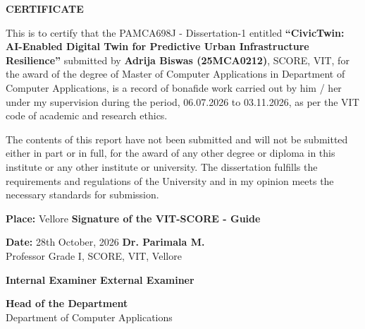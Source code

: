 \begin{center}
    {\fontsize{14pt}{18pt}\selectfont \textbf{CERTIFICATE}\par}
\end{center}
\vspace{1.5cm}

\noindent This is to certify that the PAMCA698J - Dissertation-1 entitled \textbf{``CivicTwin: AI-Enabled Digital Twin for Predictive Urban Infrastructure Resilience''} submitted by \textbf{Adrija Biswas (25MCA0212)}, SCORE, VIT, for the award of the degree of Master of Computer Applications in Department of Computer Applications, is a record of bonafide work carried out by him / her under my supervision during the period, 06.07.2026 to 03.11.2026, as per the VIT code of academic and research ethics.

\vspace{0.8cm}
\noindent The contents of this report have not been submitted and will not be submitted either in part or in full, for the award of any other degree or diploma in this institute or any other institute or university. The dissertation fulfills the requirements and regulations of the University and in my opinion meets the necessary standards for submission.

\vspace{2.5cm}
\noindent \textbf{Place:} Vellore \hfill \textbf{Signature of the VIT-SCORE - Guide}

\vspace{0.2cm}
\noindent \textbf{Date:} 28th October, 2026 \hfill \textbf{Dr. Parimala M.} \\
\null \hfill Professor Grade I, SCORE, VIT, Vellore

\vspace{2.5cm}
\noindent \textbf{Internal Examiner} \hfill \textbf{External Examiner}

\vspace{2.5cm}
\begin{center}
    \textbf{Head of the Department}\\
    Department of Computer Applications
\end{center}

\clearpage
